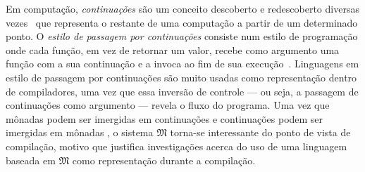 \vspace{.5\baselineskip}
Em computação, \emph{continuações} são um conceito descoberto e redescoberto diversas vezes~\citep{Reynolds.1993} que representa o restante de uma computação a partir de um determinado ponto.
O \emph{estilo de passagem por continuações} consiste num estilo de programação onde cada função, em vez de retornar um valor, recebe como argumento uma função com a sua continuação e a invoca ao fim de sua execução~\citep{Thielecke.1999}.
Linguagens em estilo de passagem por continuações são muito usadas como representação dentro de compiladores, uma vez que essa inversão de controle --- ou seja, a passagem de continuações como argumento --- revela o fluxo do programa.
Uma vez que mônadas podem ser imergidas em continuações e continuações podem ser imergidas em mônadas \citep{Filinski.1994}, o sistema $\mathfrak{M}$ torna-se interessante do ponto de vista de compilação, motivo que justifica investigações acerca do uso de uma linguagem baseada em $\mathfrak{M}$ como representação durante a compilação.
